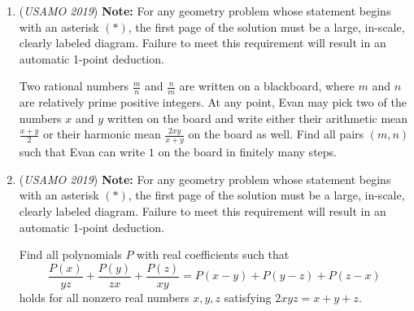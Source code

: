 \begin{enumerate}
 Let $n$ be a nonnegative integer. Determine the number of ways that one can choose $(n+1)^2$ sets $S_{i,j}\subseteq\{1,2,\ldots,2n\}$, for integers $i,j$ with $0\leq i,j\leq n$, such that:
for all $0\leq i,j\leq n$, the set $S_{i,j}$ has $i+j$ elements; and
$S_{i,j}\subseteq S_{k,l}$ whenever $0\leq i\leq k\leq n$ and $0\leq j\leq l\leq n$.


 

	\item (\textit{USAMO 2019}) \textbf{Note:} For any geometry problem whose statement begins with an asterisk $(*)$, the first page of the solution must be a large, in-scale, clearly labeled diagram. Failure to meet this requirement will result in an automatic 1-point deduction.


 Two rational numbers $\frac{m}{n}$ and $\frac{n}{m}$ are written on a blackboard, where $m$ and $n$ are relatively prime positive integers. At any point, Evan may pick two of the numbers $x$ and $y$ written on the board and write either their arithmetic mean $\frac{x+y}{2}$ or their harmonic mean $\frac{2xy}{x+y}$ on the board as well. Find all pairs $(m,n)$ such that Evan can write $1$ on the board in finitely many steps.


 

	\item (\textit{USAMO 2019}) \textbf{Note:} For any geometry problem whose statement begins with an asterisk $(*)$, the first page of the solution must be a large, in-scale, clearly labeled diagram. Failure to meet this requirement will result in an automatic 1-point deduction.


 Find all polynomials $P$ with real coefficients such that 
 \[\frac{P(x)}{yz}+\frac{P(y)}{zx}+\frac{P(z)}{xy}=P(x-y)+P(y-z)+P(z-x)\]holds for all nonzero real numbers $x,y,z$ satisfying $2xyz=x+y+z$.


 

\end{enumerate}